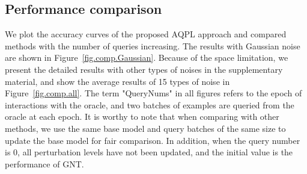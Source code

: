 \documentclass[letterpaper]{article} %
\begin{document}
		
		

\subsection{Performance comparison}
We plot the accuracy curves of the proposed AQPL approach and compared methods with the number of queries increasing. The results with Gaussian noise are shown in Figure~\ref{fig.comp.Gaussian}. Because of the space limitation, we present the detailed results with other types of noises in the supplementary material, and show the average results of 15 types of noise in Figure~\ref{fig.comp.all}. The term "QueryNums" in all figures refers to the epoch of interactions with the oracle, and two batches of examples are queried from the oracle at each epoch. It is worthy to note that when comparing with other methods, we use the same base model and query batches of the same size to update the base model for fair comparison. In addition, when the query number is $0$, all perturbation levels have not been updated, and the initial value is the performance of GNT.
\end{document}
